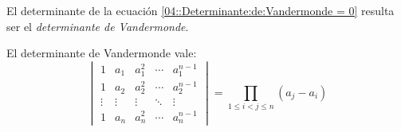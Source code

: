   El determinante de la ecuación \eqref{04::Determinante:de:Vandermonde = 0}
  resulta ser el \emph{determinante de Vandermonde}.
  \begin{theorem}
    El determinante de Vandermonde vale:
    \begin{equation*}
      \begin{vmatrix}
        1 & a_1 & a_1^2 & \cdots & a_1^{n - 1} \\
        1 & a_2 & a_2^2 & \cdots & a_2^{n - 1} \\
        \vdots & \vdots & \vdots & \ddots & \vdots \\
        1 & a_n & a_n^2 & \cdots & a_n^{n - 1}
      \end{vmatrix}
        = \prod_{1 \le i < j \le n} (a_j - a_i)
    \end{equation*}
  \end{theorem}
